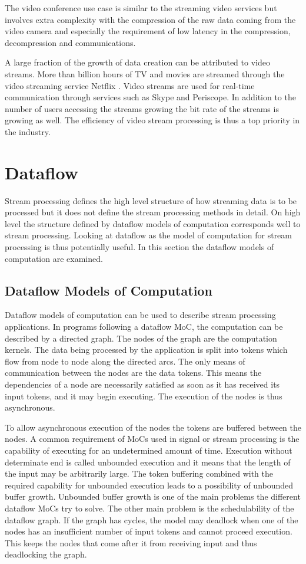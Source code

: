 The video conference use case is similar to the streaming video services but involves extra complexity with the compression of the raw data coming from the video camera and especially the requirement of low latency in the compression, decompression and communications.

A large fraction of the growth of data creation can be attributed to video streams. More than billion hours of TV and movies are streamed through the video streaming service Netflix \cite{turner2014digital}. Video streams are used for real-time communication through services such as Skype and Periscope. In addition to the number of users accessing the streams growing the bit rate of the streams is growing as well. The efficiency of video stream processing is thus a top priority in the industry.

\section{Dataflow}
\label{sec:dataflow-models}
Stream processing defines the high level structure of how streaming data is to be processed but it does not define the stream processing methods in detail. On high level the structure defined by dataflow models of computation corresponds well to stream processing. Looking at dataflow as the model of computation for stream processing is thus potentially useful. In this section the dataflow models of computation are examined.

\subsection{Dataflow Models of Computation}
\label{subsec:dataflow-moc}
Dataflow models of computation can be used to describe stream processing applications. In programs following a dataflow MoC, the computation can be described by a directed graph. The nodes of the graph are the computation kernels. The data being processed by the application is split into tokens which flow from node to node along the directed arcs. The only means of communication between the nodes are the data tokens. This means the dependencies of a node are necessarily satisfied as soon as it has received its input tokens, and it may begin executing. The execution of the nodes is thus asynchronous.~\cite{lee2015introduction}

To allow asynchronous execution of the nodes the tokens are buffered between the nodes. A common requirement of MoCs used in signal or stream processing is the capability of executing for an undetermined amount of time. Execution without determinate end is called unbounded execution and it means that the length of the input may be arbitrarily large. The token buffering combined with the required capability for unbounded execution leads to a possibility of unbounded buffer growth. Unbounded buffer growth is one of the main problems the different dataflow MoCs try to solve. The other main problem is the schedulability of the dataflow graph. If the graph has cycles, the model may deadlock when one of the nodes has an insufficient number of input tokens and cannot proceed execution. This keeps the nodes that come after it from receiving input and thus deadlocking the graph.~\cite{lee2015introduction}

